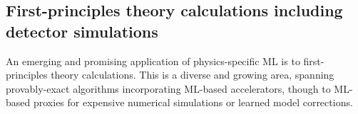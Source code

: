 \documentclass[submission,Phys]{SciPost}
\begin{document}
\begin{comment}
\begin{itemize}
    \item Physics problems (not just HEP) have specific features e.g., symmetries, data structures, etc not shared by industry applications of ML, need to build in physics
    \item spans provably-exact ways of accelerating first-principles physics calculations through to detector simulation
\end{itemize}
\end{comment}

\subsection{First-principles theory calculations including detector simulations}

\begin{comment}
\begin{itemize}
    \item ML not just for experiment or data analysis, also first-principles theory
    \item brief overview of types of applications
    \item Comment about ML incorporated into provably-exact algorithms and outline how this can be done (e.g., accelerate by tuning parameters of known alg, accelerate by changing to easier problem with same solution, accelerate by solving approximately but with known correction)
\end{itemize}
\end{comment}

An emerging and promising application of physics-specific ML is to first-principles theory calculations. This is a diverse and growing area, spanning provably-exact algorithms incorporating ML-based accelerators, though to ML-based proxies for expensive numerical simulations or learned model corrections. 
\end{document}
